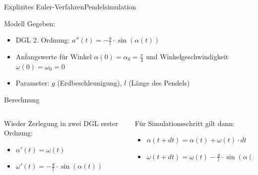 \documentclass[xelatex,aspectratio=169]{beamer}
\begin{document}
\begin{frame}{Explizites Euler-Verfahren}{Pendelsimulation}
    \begin{block}{Modell}
        Gegeben:
        \begin{itemize}
            \item DGL 2. Ordnung: $a''(t) = -\frac{g}{l} \cdot \sin(\alpha(t))$
            \item Anfangswerte für Winkel $\alpha(0) = \alpha_0 = \frac{\pi}{4}$ und Winkelgeschwindigkeit $\omega(0) = \omega_0 = 0$
            \item Parameter: $g$ (Erdbeschleunigung), $l$ (Länge des Pendels)
        \end{itemize}
    \end{block}
    \begin{block}{Berechnung}
        \begin{columns}[onlytextwidth]
            \begin{column}{0.47\textwidth}
                Wieder Zerlegung in zwei DGL erster Ordnung:
                \begin{itemize}
                    \item $\alpha'(t) = \omega(t)$
                    \item $\omega'(t) = -\frac{g}{l} \cdot \sin(\alpha(t))$
                \end{itemize}
            \end{column}
            \begin{column}{0.47\textwidth}
                Für Simulationsschritt gilt dann:
                \begin{itemize}
                    \item $\alpha(t + dt) = \alpha(t) + \omega(t) \cdot dt$
                    \item $\omega(t + dt) = \omega(t) - \frac{g}{l} \cdot \sin(\alpha(t)) \cdot dt$
                \end{itemize}
            \end{column}
        \end{columns}
    \end{block}
\end{frame}
\end{document}
